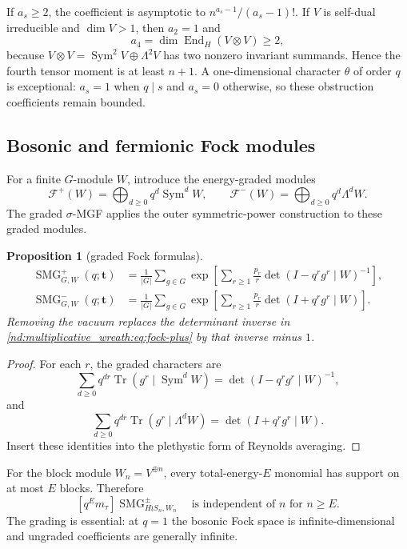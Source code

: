\documentclass[10pt]{article}
\newcommand{\Sym}{\operatorname{Sym}}
\newcommand{\Tr}{\operatorname{Tr}}
\newcommand{\SMG}{\operatorname{SMG}}
\newcommand{\MGF}{\SMG}
\newtheorem{proposition}{Proposition}
\begin{document}
If $a_s\ge2$, the coefficient is asymptotic to
$n^{a_s-1}/(a_s-1)!$.  If $V$ is self-dual irreducible and $\dim V>1$, then
$a_2=1$ and
\[
 a_4=\dim\operatorname{End}_H(V\otimes V)\ge2,
\]
because $V\otimes V=\Sym^2V\oplus\Lambda^2V$ has two nonzero invariant
summands.  Hence the fourth tensor moment is at least $n+1$.  A
one-dimensional character $\theta$ of order $q$ is exceptional:
$a_s=1$ when $q\mid s$ and $a_s=0$ otherwise, so these obstruction
coefficients remain bounded.

\subsection{Bosonic and fermionic Fock modules}

For a finite $G$-module $W$, introduce the energy-graded modules
\[
 \mathcal F^+(W)=\bigoplus_{d\ge0}q^d\Sym^dW,
 \qquad
 \mathcal F^-(W)=\bigoplus_{d\ge0}q^d\Lambda^dW.
\]
The graded $\sigma$-MGF applies the outer symmetric-power construction to
these graded modules.

\begin{proposition}[graded Fock formulas]\label{nd:multiplicative_wreath:prop:fock}
\begin{align}
 \MGF^+_{G,W}(q;\mathbf t)
 &=\frac1{|G|}\sum_{g\in G}\exp\!\left[
 \sum_{r\ge1}\frac{p_r}{r}\det(I-q^rg^r\mid W)^{-1}\right],
 \label{nd:multiplicative_wreath:eq:fock-plus}\\
 \MGF^-_{G,W}(q;\mathbf t)
 &=\frac1{|G|}\sum_{g\in G}\exp\!\left[
 \sum_{r\ge1}\frac{p_r}{r}\det(I+q^rg^r\mid W)\right].
 \label{nd:multiplicative_wreath:eq:fock-minus}
\end{align}
Removing the vacuum replaces the determinant inverse in
\eqref{nd:multiplicative_wreath:eq:fock-plus} by that inverse minus $1$.
\end{proposition}

\begin{proof}
For each $r$, the graded characters are
\[
 \sum_{d\ge0}q^{dr}\Tr(g^r\mid\Sym^dW)
 =\det(I-q^rg^r\mid W)^{-1},
\]
and
\[
 \sum_{d\ge0}q^{dr}\Tr(g^r\mid\Lambda^dW)
 =\det(I+q^rg^r\mid W).
\]
Insert these identities into the plethystic form of Reynolds averaging.
\end{proof}

For the block module $W_n=V^{\oplus n}$, every total-energy-$E$ monomial has
support on at most $E$ blocks.  Therefore
\begin{equation}\label{nd:multiplicative_wreath:eq:fock-stability}
 [q^Em_\tau]\MGF^\pm_{H\wr S_n,W_n}
 \quad\text{is independent of $n$ for $n\ge E$.}
\end{equation}
The grading is essential: at $q=1$ the bosonic Fock space is
infinite-dimensional and ungraded coefficients are generally infinite.
\end{document}
